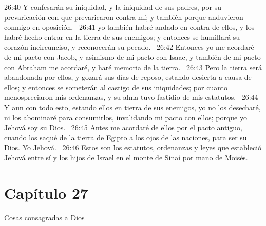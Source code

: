 26:40 Y confesarán su iniquidad, y la iniquidad de sus padres, por su prevaricación con que prevaricaron contra mí; y también porque anduvieron conmigo en oposición,  
26:41 yo también habré andado en contra de ellos, y los habré hecho entrar en la tierra de sus enemigos; y entonces se humillará su corazón incircunciso, y reconocerán su pecado.  
26:42 Entonces yo me acordaré de mi pacto con Jacob, y asimismo de mi pacto con Isaac, y también de mi pacto con Abraham me acordaré, y haré memoria de la tierra.  
26:43 Pero la tierra será abandonada por ellos, y gozará sus días de reposo, estando desierta a causa de ellos; y entonces se someterán al castigo de sus iniquidades; por cuanto menospreciaron mis ordenanzas, y su alma tuvo fastidio de mis estatutos.  
26:44 Y aun con todo esto, estando ellos en tierra de sus enemigos, yo no los desecharé, ni los abominaré para consumirlos, invalidando mi pacto con ellos; porque yo Jehová soy su Dios.  
26:45 Antes me acordaré de ellos por el pacto antiguo, cuando los saqué de la tierra de Egipto a los ojos de las naciones, para ser su Dios. Yo Jehová.  
26:46 Estos son los estatutos, ordenanzas y leyes que estableció Jehová entre sí y los hijos de Israel en el monte de Sinaí por mano de Moisés.  
\section*{Capítulo 27 }
Cosas consagradas a Dios  

